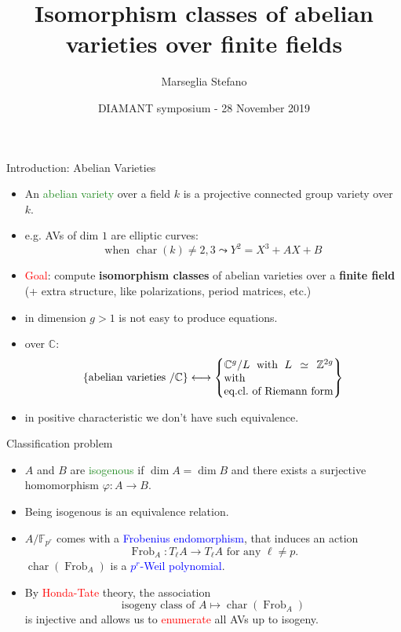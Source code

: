 \documentclass[usenames,dvipsnames]{beamer}
\title[]{Isomorphism classes of abelian varieties over finite fields}
\subtitle{}
\author[Marseglia Stefano]{Marseglia Stefano}
\institute[]{Utrecht University}
\date[28 November 2019]{DIAMANT symposium - 28 November 2019}
\def\Z{\mathbb{Z}}
\def\C{\mathbb{C}}
\def\F{\mathbb{F}}
\DeclareMathOperator{\Char}{char}
\DeclareMathOperator{\Frob}{Frob}
\newcommand{\set}[1]{\left\lbrace#1\right\rbrace }
\newcommand{\red}[1]{\textcolor{red}{#1}}
\newcommand{\blue}[1]{\textcolor{blue}{#1}}
\newcommand{\green}[1]{\textcolor{ForestGreen}{#1}}
\begin{document}
\begin{frame}
\titlepage
\end{frame}

\begin{frame}{ Introduction: Abelian Varieties }
\begin{itemize}
 \item An \green{abelian variety} over a field $k$ is a projective connected group variety over $k$.
 \pause \item e.g. AVs of dim $1$ are elliptic curves:
 \[\text{when }\Char(k)\neq 2,3 \leadsto Y^2=X^3+AX+B  \]
 \vspace{-2em}\pause \item \red{Goal}: compute \textbf{isomorphism classes} of abelian varieties over a \textbf{finite field} (+ extra structure, like polarizations, period matrices, etc.)
 \pause \item in dimension $g>1$ is not easy to produce equations.
 \pause \item over $\C$:
 \[
      \set{ \text{abelian varieties $/\C$} } \longleftrightarrow 
      \set{\parbox[c]{10em}{$\C^g/L$ with $L\simeq \Z^{2g}$ with\\eq.cl.~of Riemann form}}
 \]
 \pause \vspace{-6mm} \item in positive characteristic we don't have such equivalence.
\end{itemize}
\end{frame}

\begin{frame}{ Classification problem }
	\begin{itemize}
		\item $A$ and $B$ are \green{isogenous} if $\dim A=\dim B$ and there exists a surjective homomorphism $\varphi:A\to B$.
		\pause \item Being isogenous is an equivalence relation.
		\pause \item $A/\F_{p^r}$ comes with a \blue{Frobenius endomorphism}, that induces an action
		\[ \Frob_A : T_\ell A \rightarrow T_\ell A \text{ for any }\ell\neq p. \]
		$\Char(\Frob_A)$ is a \blue{$p^r$-Weil polynomial}.
		\pause \item By \red{Honda-Tate} theory, the association
		\[ \text{isogeny class of }A \mapsto \Char(\Frob_A)\]
		is injective and allows us to \red{enumerate} all AVs up to isogeny.
	\end{itemize}
\end{frame}
\end{document}
